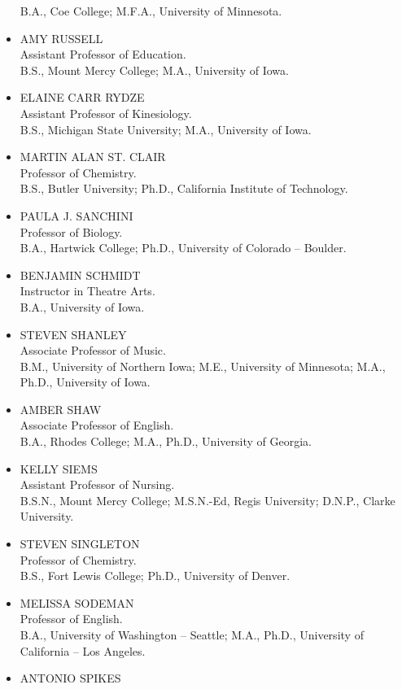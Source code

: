 \documentclass[
  letterpaper,
]{scrbook}
\begin{document}
\begin{itemize}
  B.A., Coe College; M.F.A., University of Minnesota.
\item
  AMY RUSSELL\\
  Assistant Professor of Education.\\
  B.S., Mount Mercy College; M.A., University of Iowa.
\item
  ELAINE CARR RYDZE\\
  Assistant Professor of Kinesiology.\\
  B.S., Michigan State University; M.A., University of Iowa.
\item
  MARTIN ALAN ST. CLAIR\\
  Professor of Chemistry.\\
  B.S., Butler University; Ph.D., California Institute of Technology.
\item
  PAULA J. SANCHINI\\
  Professor of Biology.\\
  B.A., Hartwick College; Ph.D., University of Colorado -- Boulder.
\item
  BENJAMIN SCHMIDT\\
  Instructor in Theatre Arts.\\
  B.A., University of Iowa.
\item
  STEVEN SHANLEY\\
  Associate Professor of Music.\\
  B.M., University of Northern Iowa; M.E., University of Minnesota;
  M.A., Ph.D., University of Iowa.
\item
  AMBER SHAW\\
  Associate Professor of English.\\
  B.A., Rhodes College; M.A., Ph.D., University of Georgia.
\item
  KELLY SIEMS\\
  Assistant Professor of Nursing.\\
  B.S.N., Mount Mercy College; M.S.N.-Ed, Regis University; D.N.P.,
  Clarke University.
\item
  STEVEN SINGLETON\\
  Professor of Chemistry.\\
  B.S., Fort Lewis College; Ph.D., University of Denver.
\item
  MELISSA SODEMAN\\
  Professor of English.\\
  B.A., University of Washington -- Seattle; M.A., Ph.D., University of
  California -- Los Angeles.
\item
  ANTONIO SPIKES\\

\end{itemize}
\end{document}
